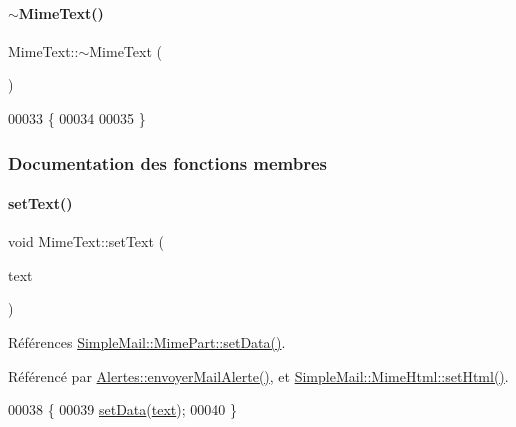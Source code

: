 \paragraph{\texorpdfstring{$\sim$\+Mime\+Text()}{~MimeText()}}
{\footnotesize\ttfamily Mime\+Text\+::$\sim$\+Mime\+Text (\begin{DoxyParamCaption}{ }\end{DoxyParamCaption})}


\begin{DoxyCode}
00033 \{
00034 
00035 \}
\end{DoxyCode}


\subsubsection{Documentation des fonctions membres}
\mbox{\label{class_simple_mail_1_1_mime_text_ad7ebe9a3a94fd26b287bed8e228b09e4}} 
\paragraph{\texorpdfstring{set\+Text()}{setText()}}
{\footnotesize\ttfamily void Mime\+Text\+::set\+Text (\begin{DoxyParamCaption}\item[{const Q\+String \&}]{text }\end{DoxyParamCaption})}



Références \hyperlink{class_simple_mail_1_1_mime_part_aa179fea0ab0a77771cbec0944e6b7967}{Simple\+Mail\+::\+Mime\+Part\+::set\+Data()}.



Référencé par \hyperlink{class_alertes_a375783502a78109f3323dc1ed90cfdc9}{Alertes\+::envoyer\+Mail\+Alerte()}, et \hyperlink{class_simple_mail_1_1_mime_html_a77a32b559dcebf04e66816fdd055038c}{Simple\+Mail\+::\+Mime\+Html\+::set\+Html()}.


\begin{DoxyCode}
00038 \{
00039     \hyperlink{class_simple_mail_1_1_mime_part_aa179fea0ab0a77771cbec0944e6b7967}{setData}(\hyperlink{class_simple_mail_1_1_mime_text_a0e08eb04baae349411b7b94e968147fb}{text});
00040 \}
\end{DoxyCode}
\mbox{\label{class_simple_mail_1_1_mime_text_a0e08eb04baae349411b7b94e968147fb}} 
